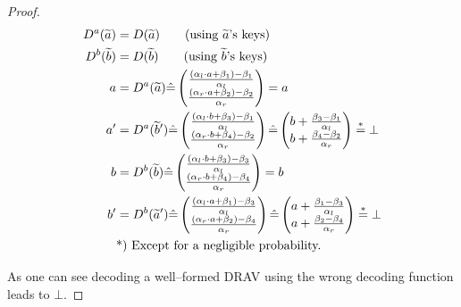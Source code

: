 \begin{proof}
  \begin{align*}
    D^a(\widetilde{a}) &= D(\widetilde{a}) \qquad\text{(using $\widetilde{a}$'s
    keys)}\\
    D^b(\widetilde{b}) &= D(\widetilde{b}) \qquad\text{(using $\widetilde{b}$'s
    keys)}\\
    a &= D^a(\widetilde{a}) \hat{=}
    \begin{pmatrix}
      \frac{(\alpha_l \cdot a + \beta_1) - \beta_1}{\alpha_l}\\
      \frac{(\alpha_r \cdot a + \beta_2) - \beta_2}{\alpha_r}\\
    \end{pmatrix}
    = a\\
    a' &= D^a(\widetilde{b}')
    \hat{=}
    \begin{pmatrix}
      \frac{(\alpha_l \cdot b + \beta_3) - \beta_1}{\alpha_l}\\
      \frac{(\alpha_r \cdot b + \beta_4) - \beta_2}{\alpha_r}\\
    \end{pmatrix}
    \hat{=}
    \begin{pmatrix}
      b +
      \frac{\beta_3 - \beta_1}{\alpha_l}\\
      b +
      \frac{\beta_4 - \beta_2}{\alpha_r}\\
    \end{pmatrix}
    \stackrel{*}{=} \bot\\
    b &= D^b(\widetilde{b}) \hat{=}
    \begin{pmatrix}
      \frac{(\alpha_l \cdot b + \beta_3) - \beta_3}{\alpha_l}\\
      \frac{(\alpha_r \cdot b + \beta_4) - \beta_4}{\alpha_r}\\
    \end{pmatrix}
    = b\\
    b' &= D^b(\widetilde{a}')
    \hat{=}
    \begin{pmatrix}
      \frac{(\alpha_l \cdot a + \beta_1) - \beta_3}{\alpha_l}\\
      \frac{(\alpha_r \cdot a + \beta_2) - \beta_4}{\alpha_r}\\
    \end{pmatrix}
    \hat{=}
    \begin{pmatrix}
      a +
      \frac{\beta_1 - \beta_3}{\alpha_l}\\
      a +
      \frac{\beta_2 - \beta_4}{\alpha_r}\\
    \end{pmatrix}
    \stackrel{*}{=} \bot\\
    &\text{*) Except for a negligible probability.}{}
  \end{align*}

  \noindent{}As one can see decoding a well--formed DRAV using the wrong
  decoding function leads to $\bot$.

\end{proof}


